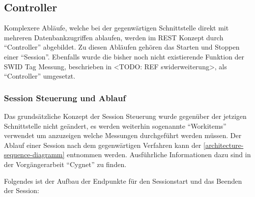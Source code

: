 \subsection{Controller}
Komplexere Abläufe, welche bei der gegenwärtigen Schnittstelle direkt mit
mehreren Datenbankzugriffen ablaufen, werden im REST Konzept durch
\enquote{Controller} abgebildet. Zu diesen Abläufen gehören das Starten und
Stoppen einer \enquote{Session}. Ebenfalls wurde die bisher noch nicht
existierende Funktion der SWID Tag Messung, beschrieben in <TODO: REF
swiderweiterung>, als \enquote{Controller} umgesetzt.

\subsubsection{Session Steuerung und Ablauf}
Das grundsätzliche Konzept der Session Steuerung wurde gegenüber der jetzigen
Schnittstelle nicht geändert, es werden weiterhin sogenannte \enquote{Workitems}
verwendet um anzuzeigen welche Messungen durchgeführt werden müssen. Der Ablauf
einer Session nach dem gegenwärtigen Verfahren kann der
\autoref{architecture-sequence-diagramm} entnommen werden. Ausführliche
Informationen dazu sind in der Vorgängerarbeit
\enquote{Cygnet}\cite{cygnet:2013} zu finden.

Folgendes ist der Aufbau der Endpunkte für den Sessionstart und das Beenden der
Session:

